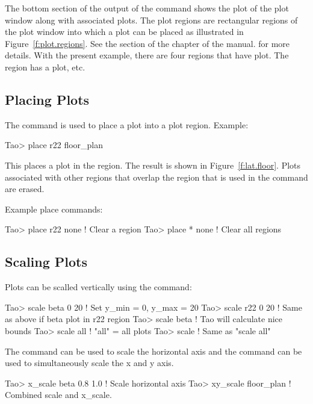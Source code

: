 \documentclass{hitec}
\begin{document}
The bottom section of the output of the  command shows the plot  of the
plot window along with associated plots. The plot regions are rectangular regions of the plot window
into which a plot can be placed as illustrated in Figure~\ref{f:plot.regions}.  See the
 section of the  chapter of the \tao manual. for
more details. With the present example, there are four regions that have plot. The  region
has a  plot, etc.


\subsection{Placing Plots}

The  command is used to place a  plot into a plot region. Example:
\begin{code}
Tao> place r22 floor_plan
\end{code}
This places a  plot in the  region.
The result is shown in Figure~\ref{f:lat.floor}. Plots associated with other regions
that overlap the region that is used in the  command are erased. 

Example place commands:
\begin{code}
Tao> place r22 none    ! Clear a region
Tao> place * none      ! Clear all regions
\end{code}

\subsection{Scaling Plots}

Plots can be scalled vertically using the  command:
\begin{code}
Tao> scale beta 0 20  ! Set y_min = 0, y_max = 20
Tao> scale r22 0 20   ! Same as above if beta plot in r22 region
Tao> scale beta       ! Tao will calculate nice bounds
Tao> scale all        ! "all" = all plots
Tao> scale            ! Same as "scale all"
\end{code}

The  command can be used to scale the horizontal axis and
the  command can be used to simultaneously scale the x and y axis.
\begin{code}
Tao> x_scale beta 0.8 1.0   ! Scale horizontal axis
Tao> xy_scale floor_plan    ! Combined scale and x_scale.
\end{code}
\end{document}
